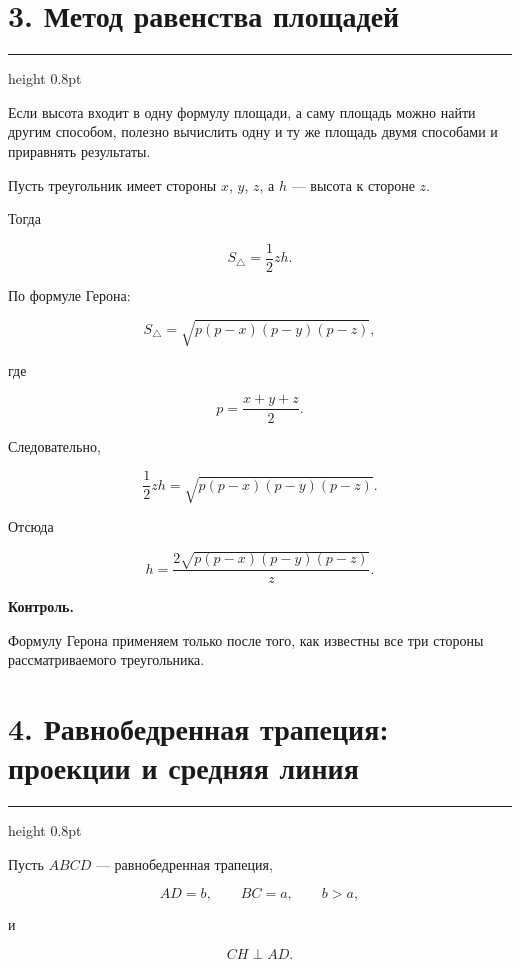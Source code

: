\documentclass[a4paper,12pt]{article}
\newcommand{\sectionline}{
  \par
  \vspace{0.2em}
  {\color{accent}\hrule height 0.8pt}
  \vspace{0.7em}
}
\newcommand{\important}[1]{
  \textbf{\color{darkaccent}#1}
}
\begin{document}
\clearpage


\section*{3. Метод равенства площадей}
\sectionline

Если высота входит в одну формулу площади, а саму площадь можно найти
другим способом, полезно вычислить одну и ту же площадь двумя способами
и приравнять результаты.

Пусть треугольник имеет стороны $x$, $y$, $z$, а $h$ --- высота
к стороне $z$.

Тогда

\[
S_{\triangle}
=
\frac12zh.
\]

По формуле Герона:

\[
S_{\triangle}
=
\sqrt{
p(p-x)(p-y)(p-z)
},
\]

где

\[
p=\frac{x+y+z}{2}.
\]

Следовательно,

\[
\frac12zh
=
\sqrt{
p(p-x)(p-y)(p-z)
}.
\]

Отсюда

\[
h
=
\frac{
2\sqrt{
p(p-x)(p-y)(p-z)
}
}{z}.
\]

\important{Контроль.}
Формулу Герона применяем только после того, как известны все три стороны
рассматриваемого треугольника.


\section*{4. Равнобедренная трапеция: проекции и средняя линия}
\sectionline

Пусть $ABCD$ --- равнобедренная трапеция,

\[
AD=b,
\qquad
BC=a,
\qquad
b>a,
\]

и

\[
CH\perp AD.
\]

\begin{center}
\end{center}
\end{document}
